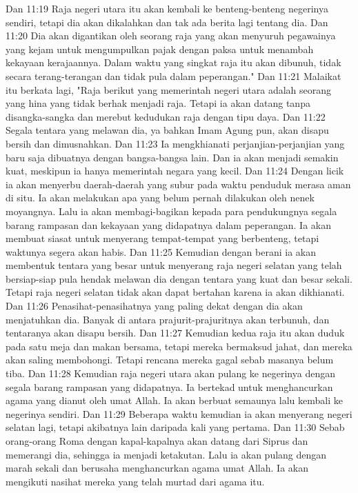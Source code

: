 Dan 11:19  Raja negeri utara itu akan kembali ke benteng-benteng negerinya sendiri, tetapi dia akan dikalahkan dan tak ada berita lagi tentang dia.
Dan 11:20  Dia akan digantikan oleh seorang raja yang akan menyuruh pegawainya yang kejam untuk mengumpulkan pajak dengan paksa untuk menambah kekayaan kerajaannya. Dalam waktu yang singkat raja itu akan dibunuh, tidak secara terang-terangan dan tidak pula dalam peperangan."
Dan 11:21  Malaikat itu berkata lagi, "Raja berikut yang memerintah negeri utara adalah seorang yang hina yang tidak berhak menjadi raja. Tetapi ia akan datang tanpa disangka-sangka dan merebut kedudukan raja dengan tipu daya.
Dan 11:22  Segala tentara yang melawan dia, ya bahkan Imam Agung pun, akan disapu bersih dan dimusnahkan.
Dan 11:23  Ia mengkhianati perjanjian-perjanjian yang baru saja dibuatnya dengan bangsa-bangsa lain. Dan ia akan menjadi semakin kuat, meskipun ia hanya memerintah negara yang kecil.
Dan 11:24  Dengan licik ia akan menyerbu daerah-daerah yang subur pada waktu penduduk merasa aman di situ. Ia akan melakukan apa yang belum pernah dilakukan oleh nenek moyangnya. Lalu ia akan membagi-bagikan kepada para pendukungnya segala barang rampasan dan kekayaan yang didapatnya dalam peperangan. Ia akan membuat siasat untuk menyerang tempat-tempat yang berbenteng, tetapi waktunya segera akan habis.
Dan 11:25  Kemudian dengan berani ia akan membentuk tentara yang besar untuk menyerang raja negeri selatan yang telah bersiap-siap pula hendak melawan dia dengan tentara yang kuat dan besar sekali. Tetapi raja negeri selatan tidak akan dapat bertahan karena ia akan dikhianati.
Dan 11:26  Penasihat-penasihatnya yang paling dekat dengan dia akan menjatuhkan dia. Banyak di antara prajurit-prajuritnya akan terbunuh, dan tentaranya akan disapu bersih.
Dan 11:27  Kemudian kedua raja itu akan duduk pada satu meja dan makan bersama, tetapi mereka bermaksud jahat, dan mereka akan saling membohongi. Tetapi rencana mereka gagal sebab masanya belum tiba.
Dan 11:28  Kemudian raja negeri utara akan pulang ke negerinya dengan segala barang rampasan yang didapatnya. Ia bertekad untuk menghancurkan agama yang dianut oleh umat Allah. Ia akan berbuat semaunya lalu kembali ke negerinya sendiri.
Dan 11:29  Beberapa waktu kemudian ia akan menyerang negeri selatan lagi, tetapi akibatnya lain daripada kali yang pertama.
Dan 11:30  Sebab orang-orang Roma dengan kapal-kapalnya akan datang dari Siprus dan memerangi dia, sehingga ia menjadi ketakutan. Lalu ia akan pulang dengan marah sekali dan berusaha menghancurkan agama umat Allah. Ia akan mengikuti nasihat mereka yang telah murtad dari agama itu.
